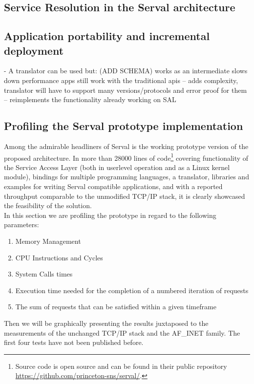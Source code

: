 \subsection{Service Resolution in the Serval architecture}

\subsection{Application portability and incremental deployment}
- A translator can be used but: (ADD SCHEMA)
works as an intermediate
slows down performance
apps still work with the traditional apis
 -- adds complexity, translator will have to support many versions/protocols and error proof for them
 -- reimplements the functionality already working on SAL




\subsection{Profiling the Serval prototype implementation}
Among the admirable headliners of Serval is the working prototype version of the proposed architecture.
In more than 28000 lines of code\footnote{Source code is open source and can be found in their public repository\\ \url{https://github.com/princeton-sns/serval/}.} covering functionality of the Service Access Layer (both in userlevel operation and as a Linux kernel module), bindings for multiple programming languages, a translator, libraries and examples for writing Serval compatible applications, and with a reported throughput comparable to the unmodified TCP/IP stack, it is clearly showcased the feasibility of the solution.\\
\indent In this section we are profiling the prototype in regard to the following parameters:
\begin{enumerate}
  \item Memory Management
  \item CPU Instructions and Cycles
  \item System Calls times
  \item Execution time needed for the completion of a numbered iteration of requests
  \item The sum of requests that can be satisfied within a given timeframe
\end{enumerate}
Then we will be graphically presenting the results juxtaposed to the measurements of the unchanged TCP/IP stack and the AF\_INET family. The first four tests have not been published before.
